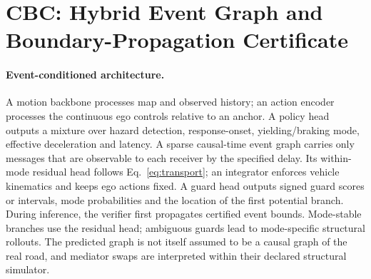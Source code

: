 \documentclass[10pt]{article}
\begin{document}
\section{CBC: Hybrid Event Graph and Boundary-Propagation Certificate}
\label{app:cbcimpl}
\paragraph{Event-conditioned architecture.}
A motion backbone processes map and observed history; an action encoder processes the continuous ego controls relative to an anchor. A policy head outputs a mixture over hazard detection, response-onset, yielding/braking mode, effective deceleration and latency. A sparse causal-time event graph carries only messages that are observable to each receiver by the specified delay. Its within-mode residual head follows Eq.~\eqref{eq:transport}; an integrator enforces vehicle kinematics and keeps ego actions fixed. A guard head outputs signed guard scores or intervals, mode probabilities and the location of the first potential branch. During inference, the verifier first propagates certified event bounds. Mode-stable branches use the residual head; ambiguous guards lead to mode-specific structural rollouts. The predicted graph is not itself assumed to be a causal graph of the real road, and mediator swaps are interpreted within their declared structural simulator.
\end{document}
